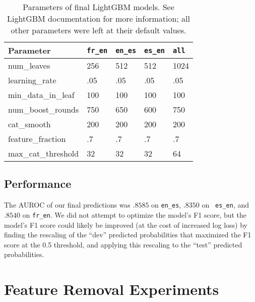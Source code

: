 \documentclass[11pt,a4paper]{article}
\begin{document}
\begin{table}[t!]
\begin{center}
\begin{tabular}{|l|llll|}
  \hline \bf Parameter & {\tt fr\_en} & {\tt en\_es} & {\tt es\_en} & {\tt all} \\ \hline
  num\_leaves & 256 & 512 & 512 & 1024 \\
  learning\_rate & .05 & .05 & .05 & .05 \\
  min\_data\_in\_leaf & 100 & 100 & 100 & 100 \\
  num\_boost\_rounds & 750 & 650 & 600 & 750 \\
  cat\_smooth & 200 & 200 & 200& 200 \\
  feature\_fraction & .7 & .7 & .7 & .7 \\
  max\_cat\_threshold & 32 & 32 & 32& 64 \\

\hline
\end{tabular}
\end{center}
\caption{\label{lightgbm-params} Parameters of final LightGBM models. See
  LightGBM documentation for more information; all other parameters were left at
their default values.}
\end{table}

\subsection{Performance}

The AUROC of our final predictions was $.8585$ on {\tt en\_es}, $.8350$ on {\tt
  es\_en}, and $.8540$ on {\tt fr\_en}. We did not attempt to optimize the model's
F1 score, but the model's F1 score could likely be improved (at the cost of
increased log loss) by finding the
rescaling of the ``dev'' predicted probabilities that maximized the F1 score at
the 0.5 threshold, and applying this rescaling to the ``test'' predicted probabilities.

\section{Feature Removal Experiments}



\end{document}
